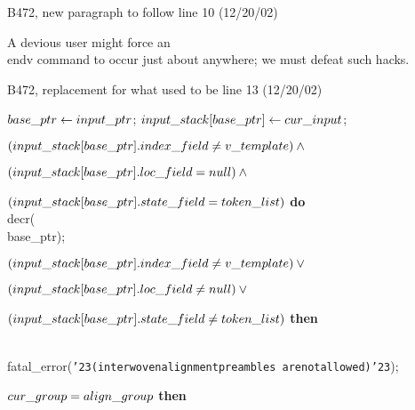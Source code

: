 {{\bugonpage B472, new paragraph to follow line 10 (12/20/02)

\tenpoint\noindent\quad
A devious user might force an \\{endv} command to occur just about anywhere;
we must defeat such hacks.

\bugonpage B472, replacement for what used to be line 13 (12/20/02)

\ninepoint\noindent
{} $\\{base\_ptr}\gets\\{input\_ptr}$;
 $\\{input\_stack}[\\{base\_ptr}]\gets\\{cur\_input}$;\par\noindent
{} $(\\{input\_stack}[\\{base\_ptr}].\\{index\_field}\ne
  \\{v\_template}) \land{}$\par\noindent
\quad\qquad $(\\{input\_stack}[\\{base\_ptr}].\\{loc\_field}=
  \\{null}) \land {}$\par\noindent
\quad\qquad $(\\{input\_stack}[\\{base\_ptr}].\\{state\_field}=
  \\{token\_list})$ {\bf do} \\{decr}(\\{base\_ptr});\par\noindent
{} $(\\{input\_stack}[\\{base\_ptr}].\\{index\_field}\ne
  \\{v\_template}) \lor {}$\par\noindent
\quad\qquad $(\\{input\_stack}[\\{base\_ptr}].\\{loc\_field}\ne
  \\{null}) \lor {}$\par\noindent
\quad\qquad $(\\{input\_stack}[\\{base\_ptr}].\\{state\_field}\ne
  \\{token\_list})$ {\bf then}\par\noindent
\qquad\\{fatal\_error}(\hbox{\tt\char'23(interwoven\]alignment\]preambles\]%
    are\]not\]allowed)\char'23});\par\noindent
{} $\\{cur\_group}=\\{align\_group}$ {\bf then}

}}
